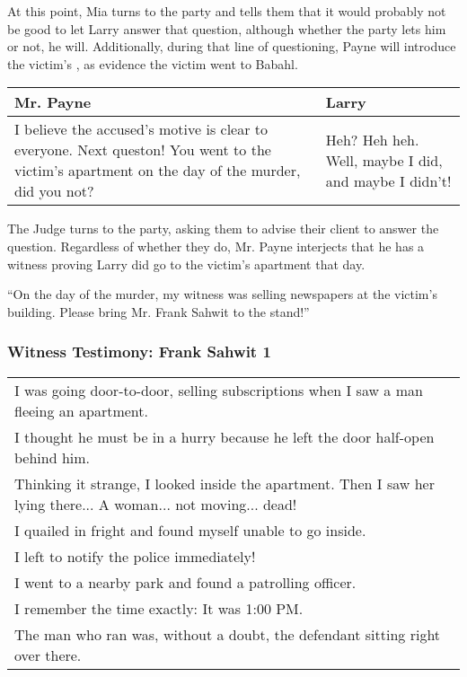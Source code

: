 At this point, Mia turns to the party and tells them that it would probably not be good to let Larry answer that question, although whether the party lets him or not, he will. Additionally, during that line of questioning, Payne will introduce the victim's , as evidence the victim went to Babahl.


\begin{center}
\begin{tabular}{p{2.5in} p{2.5in}}
Mr. Payne & Larry \\\hline
I believe the accused's motive is clear to everyone. Next queston! You went to the victim's apartment on the day of the murder, did you not? & Heh? Heh heh. Well, maybe I did, and maybe I didn't!
\end{tabular}
\end{center}

The Judge turns to the party, asking them to advise their client to answer the question. Regardless of whether they do, Mr. Payne interjects that he has a witness proving Larry did go to the victim's apartment that day. 

\begin{center}
``On the day of the murder, my witness was selling newspapers at the victim's building. Please bring Mr. Frank Sahwit to the stand!''
\end{center}

\subsubsection{Witness Testimony: Frank Sahwit 1}
\begin{center}
\begin{tabular}{p{4in}}
I was going door-to-door, selling subscriptions when I saw a man fleeing an apartment.\\
I thought he must be in a hurry because he left the door half-open behind him. \\
Thinking it strange, I looked inside the apartment. Then I saw her lying there... A woman... not moving... dead! \\
I quailed in fright and found myself unable to go inside. \\
I left to notify the police immediately! \\
I went to a nearby park and found a patrolling officer. \\
I remember the time exactly: It was 1:00 PM. \\
The man who ran was, without a doubt, the defendant sitting right over there. \\
\end{tabular}
\end{center}


